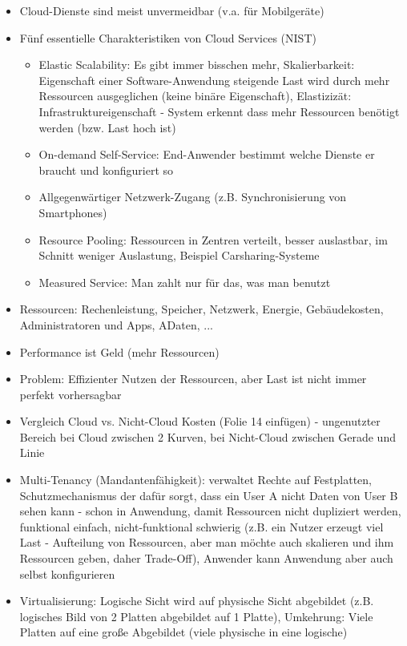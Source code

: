 \documentclass[paper=a4, fontsize=11pt]{scrartcl} %
\numberwithin{equation}{section} %
\numberwithin{figure}{section} %
\numberwithin{table}{section} %
\begin{document}
\begin{itemize}
  \item Cloud-Dienste sind meist unvermeidbar (v.a. für Mobilgeräte)
  \item Fünf essentielle Charakteristiken von Cloud Services (NIST)
  \begin{itemize}
    \item Elastic Scalability: Es gibt immer bisschen mehr, Skalierbarkeit: Eigenschaft einer Software-Anwendung steigende Last wird durch mehr Ressourcen ausgeglichen (keine binäre Eigenschaft), Elastizizät: Infrastruktureigenschaft - System erkennt dass mehr Ressourcen benötigt werden (bzw. Last hoch ist)
    \item On-demand Self-Service: End-Anwender bestimmt welche Dienste er braucht und konfiguriert so
    \item Allgegenwärtiger Netzwerk-Zugang (z.B. Synchronisierung von Smartphones)
    \item Resource Pooling: Ressourcen in Zentren verteilt, besser auslastbar, im Schnitt weniger Auslastung, Beispiel Carsharing-Systeme
    \item Measured Service: Man zahlt nur für das, was man benutzt
  \end{itemize}
  \item Ressourcen: Rechenleistung, Speicher, Netzwerk, Energie, Gebäudekosten, Administratoren und Apps, ADaten, ...
  \item Performance ist Geld (mehr Ressourcen)
  \item Problem: Effizienter Nutzen der Ressourcen, aber Last ist nicht immer perfekt vorhersagbar
  \item Vergleich Cloud vs. Nicht-Cloud Kosten (Folie 14 einfügen) - ungenutzter Bereich bei Cloud zwischen 2 Kurven, bei Nicht-Cloud zwischen Gerade und Linie
  \item Multi-Tenancy (Mandantenfähigkeit): verwaltet Rechte auf Festplatten, Schutzmechanismus der dafür sorgt, dass ein User A nicht Daten von User B sehen kann - schon in Anwendung, damit Ressourcen nicht dupliziert werden, funktional einfach, nicht-funktional schwierig (z.B. ein Nutzer erzeugt viel Last - Aufteilung von Ressourcen, aber man möchte auch skalieren und ihm Ressourcen geben, daher Trade-Off), Anwender kann Anwendung aber auch selbst konfigurieren
  \item Virtualisierung: Logische Sicht wird auf physische Sicht abgebildet (z.B. logisches Bild von 2 Platten abgebildet auf 1 Platte), Umkehrung: Viele Platten auf eine große Abgebildet (viele physische in eine logische)

\end{itemize}
\end{document}
